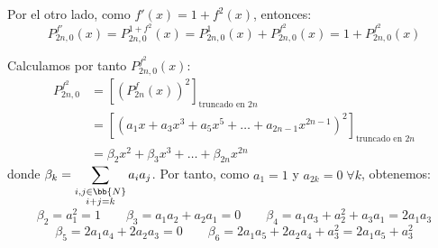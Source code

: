 \begin{ejercicio}
\begin{enumerate}
        Por el otro lado, como $f'(x)=1+f^2(x)$, entonces:
        \begin{equation}\label{Ec:Ej4.5.Derivada2}
            P_{2n,0}^{f'}(x) =
            P_{2n,0}^{1+f^2}(x) = P_{2n,0}^{1}(x) + P_{2n,0}^{f^2}(x) = 1+P_{2n,0}^{f^2}(x)
        \end{equation}

        Calculamos por tanto $P_{2n,0}^{f^2}(x)$:
        \begin{equation*}\begin{split}
            P_{2n,0}^{f^2}
            & = \left[\left(P_{2n}^f(x)\right)^2\right]_{\text{truncado en } 2n} \\
            &= \left[\left(a_1x + a_3x^3 + a_5x^5 + \dots + a_{2n-1}x^{2n-1}\right)^2\right]_{\text{truncado en } 2n}\\
            & = \beta_2x^2 + \beta_3x^3 + \dots + \beta_{2n}x^{2n}          
        \end{split}\end{equation*}
        donde $\displaystyle \beta_k = \sum_{\substack{
            i,j\in \bb{N} \\
            i+j=k}} a_ia_j$.
        Por tanto, como $a_1=1$ y $a_{2k}=0\;\forall k$, obtenemos:
        \begin{equation*}
            \beta_2 = a_1^2 = 1
            \qquad \beta_3 = a_1a_2 + a_2a_1 = 0
            \qquad \beta_4 = a_1a_3 + a_2^2 + a_3a_1 = 2a_1a_3
        \end{equation*}
        \begin{equation*}
            \beta_5 = 2a_1a_4 + 2a_2a_3 = 0 \qquad \beta_6 = 2a_1a_5 + 2a_2a_4 + a_3^2 = 2a_1a_5 + a_3^2
        \end{equation*}


\end{enumerate}
\end{ejercicio}
